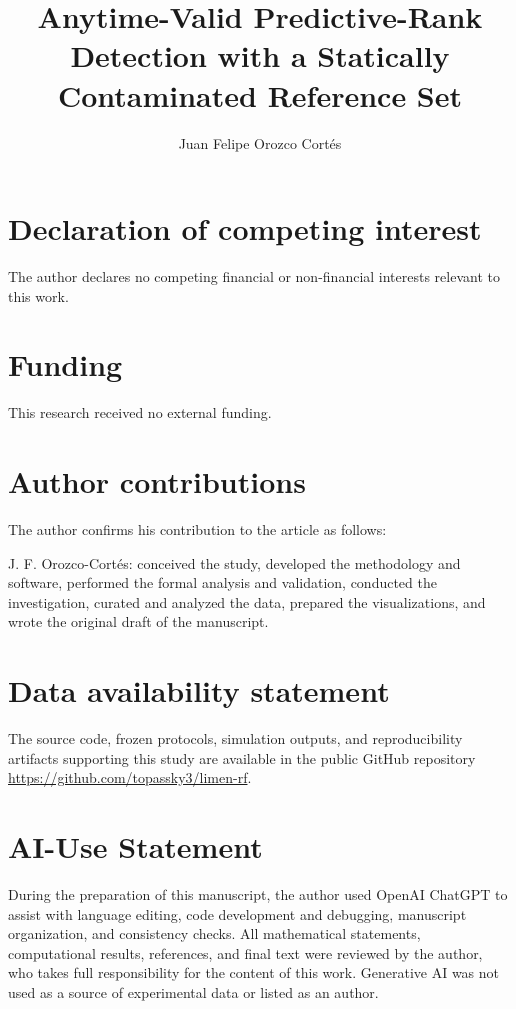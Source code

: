 \documentclass{packages/redina}
\title{Anytime-Valid Predictive-Rank Detection with a Statically Contaminated Reference Set}
\author[1]{Juan Felipe Orozco Cort\'es}
\affil[1]{Independent Researcher, Yarumal, Antioquia, Colombia}
\date{}
\begin{document}
\maketitle










\section{Declaration of competing interest}
The author declares no competing financial or non-financial interests relevant to this work.

\section{Funding}
This research received no external funding.

\section{Author contributions}
The author confirms his contribution to the article as follows:

J. F. Orozco-Cort\'es: conceived the study, developed the methodology and software, performed the formal analysis and validation, conducted the investigation, curated and analyzed the data, prepared the visualizations, and wrote the original draft of the manuscript.

\section{Data availability statement}
The source code, frozen protocols, simulation outputs, and reproducibility artifacts supporting this study are available in the public GitHub repository \url{https://github.com/topassky3/limen-rf}.

\section{AI-Use Statement}
During the preparation of this manuscript, the author used OpenAI ChatGPT to assist with language editing, code development and debugging, manuscript organization, and consistency checks. All mathematical statements, computational results, references, and final text were reviewed by the author, who takes full responsibility for the content of this work. Generative AI was not used as a source of experimental data or listed as an author.



\end{document}
